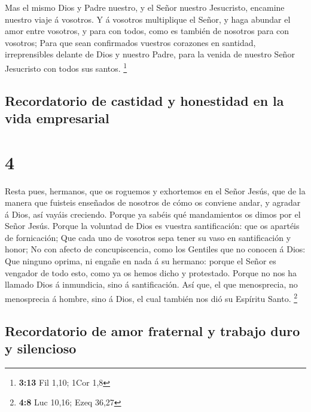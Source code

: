  Mas el mismo Dios y Padre nuestro, y el Señor nuestro
Jesucristo, encamine nuestro viaje á vosotros.  Y á
vosotros multiplique el Señor, y haga abundar el amor entre vosotros, y
para con todos, como es también de nosotros para con vosotros;
 Para que sean confirmados vuestros corazones en santidad,
irreprensibles delante de Dios y nuestro Padre, para la venida de
nuestro Señor Jesucristo con todos sus santos. \footnote{\textbf{3:13}
  Fil 1,10; 1Cor 1,8}

\hypertarget{recordatorio-de-castidad-y-honestidad-en-la-vida-empresarial}{%
\subsection{Recordatorio de castidad y honestidad en la vida
empresarial}\label{recordatorio-de-castidad-y-honestidad-en-la-vida-empresarial}}

\hypertarget{section-3}{%
\section{4}\label{section-3}}

 Resta pues, hermanos, que os roguemos y exhortemos en el
Señor Jesús, que de la manera que fuisteis enseñados de nosotros de cómo
os conviene andar, y agradar á Dios, así vayáis creciendo. 
Porque ya sabéis qué mandamientos os dimos por el Señor Jesús.
 Porque la voluntad de Dios es vuestra santificación: que os
apartéis de fornicación;  Que cada uno de vosotros sepa
tener su vaso en santificación y honor;  No con afecto de
concupiscencia, como los Gentiles que no conocen á Dios: 
Que ninguno oprima, ni engañe en nada á su hermano: porque el Señor es
vengador de todo esto, como ya os hemos dicho y protestado. 
Porque no nos ha llamado Dios á inmundicia, sino á santificación.
 Así que, el que menosprecia, no menosprecia á hombre, sino
á Dios, el cual también nos dió su Espíritu Santo. \footnote{\textbf{4:8}
  Luc 10,16; Ezeq 36,27}

\hypertarget{recordatorio-de-amor-fraternal-y-trabajo-duro-y-silencioso}{%
\subsection{Recordatorio de amor fraternal y trabajo duro y
silencioso}\label{recordatorio-de-amor-fraternal-y-trabajo-duro-y-silencioso}}

